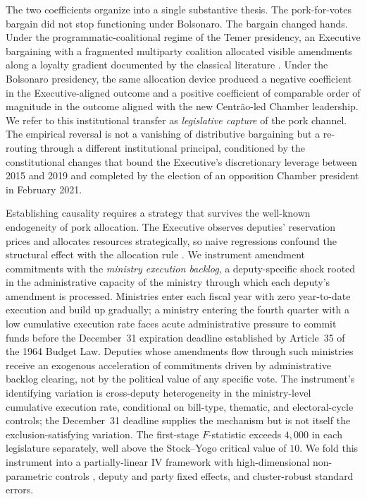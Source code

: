 \documentclass[preprint,12pt,authoryear]{elsarticle}
\begin{document}
The two coefficients organize into a single substantive thesis. The pork-for-votes bargain did not stop functioning under Bolsonaro. The bargain changed hands. Under the programmatic-coalitional regime of the Temer presidency, an Executive bargaining with a fragmented multiparty coalition allocated visible amendments along a loyalty gradient documented by the classical literature \citep{PereiraAndMueller2004,Raile2011}. Under the Bolsonaro presidency, the same allocation device produced a negative coefficient in the Executive-aligned outcome and a positive coefficient of comparable order of magnitude in the outcome aligned with the new Centr\~ao-led Chamber leadership. We refer to this institutional transfer as \emph{legislative capture} of the pork channel. The empirical reversal is not a vanishing of distributive bargaining but a re-routing through a different institutional principal, conditioned by the constitutional changes that bound the Executive's discretionary leverage between 2015 and 2019 and completed by the election of an opposition Chamber president in February 2021.

Establishing causality requires a strategy that survives the well-known endogeneity of pork allocation. The Executive observes deputies' reservation prices and allocates resources strategically, so naive regressions confound the structural effect with the allocation rule \citep{BerryGrosscloseMilyo2000,DesposatoCOE2006}. We instrument amendment commitments with the \emph{ministry execution backlog}, a deputy-specific shock rooted in the administrative capacity of the ministry through which each deputy's amendment is processed. Ministries enter each fiscal year with zero year-to-date execution and build up gradually; a ministry entering the fourth quarter with a low cumulative execution rate faces acute administrative pressure to commit funds before the December~31 expiration deadline established by Article~35 of the 1964 Budget Law. Deputies whose amendments flow through such ministries receive an exogenous acceleration of commitments driven by administrative backlog clearing, not by the political value of any specific vote. The instrument's identifying variation is cross-deputy heterogeneity in the ministry-level cumulative execution rate, conditional on bill-type, thematic, and electoral-cycle controls; the December~31 deadline supplies the mechanism but is not itself the exclusion-satisfying variation. The first-stage $F$-statistic exceeds $4{,}000$ in each legislature separately, well above the Stock--Yogo critical value of $10$. We fold this instrument into a partially-linear IV framework with high-dimensional non-parametric controls \citep{Chernozhukov2018}, deputy and party fixed effects, and cluster-robust standard errors.
\end{document}
